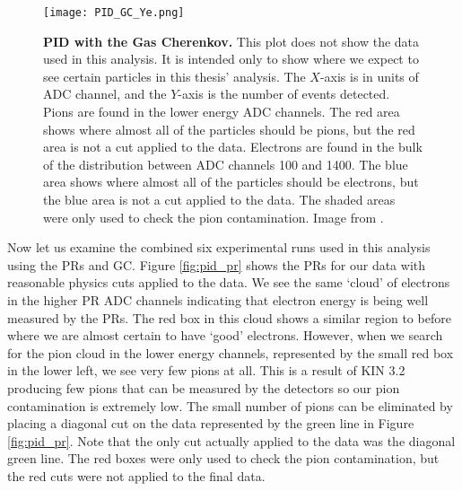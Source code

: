 \begin{figure}[!ht]
\begin{center}
\texttt{[image: PID\_GC\_Ye.png]}
\end{center}
\caption[PID with the Gas Cherenkov]{
{\bf{PID with the Gas Cherenkov.}} This plot does not show the data used in this analysis. It is intended only to show where we expect to see certain particles in this thesis' analysis. The $X$-axis is in units of ADC channel, and the $Y$-axis is the number of events detected. Pions are found in the lower energy ADC channels. The red area shows where almost all of the particles should be pions, but the red area is not a cut applied to the data. Electrons are found in the bulk of the distribution between ADC channels 100 and 1400. The blue area shows where almost all of the particles should be electrons, but the blue area is not a cut applied to the data. The shaded areas were only used to check the pion contamination. Image from \cite{Thesis:Ye}.}
\label{fig:pid_gc_ye}
\end{figure}

Now let us examine the combined six experimental runs used in this analysis using the PRs and GC. Figure \ref{fig:pid_pr} shows the PRs for our data with reasonable physics cuts applied to the data. We see the same `cloud' of electrons in the higher PR ADC channels indicating that electron energy is being well measured by the PRs. The red box in this cloud shows a similar region to before where we are almost certain to have `good' electrons. However, when we search for the pion cloud in the lower energy channels, represented by the small red box in the lower left, we see very few pions at all. This is a result of KIN 3.2 producing few pions that can be measured by the detectors so our pion contamination is extremely low. The small number of pions can be eliminated by placing a diagonal cut on the data represented by the green line in Figure \ref{fig:pid_pr}. Note that the only cut actually applied to the data was the diagonal green line. The red boxes were only used to check the pion contamination, but the red cuts were not applied to the final data.

